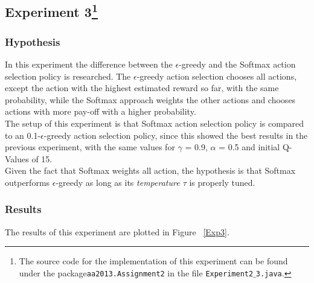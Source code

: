 \documentclass[11pt]{article}
\begin{document}
\subsection[title]{Experiment 3\footnote{The source code for the implementation of this experiment can be found under the package\texttt{aa2013.Assignment2} in the file \texttt{Experiment2$\_$3.java}.}}
\subsubsection{Hypothesis}
In this experiment the difference between the $\epsilon$-greedy and the Softmax action selection policy is researched. The $\epsilon$-greedy action selection chooses all actions, except the action with the highest estimated reward so far, with the same probability, while the Softmax approach weights the other actions and chooses actions with more pay-off with a higher probability.\\
The setup of this experiment is that Softmax action selection policy is compared to an 0.1-$\epsilon$-greedy action selection policy, since this showed the best results in the previous experiment, with the same values for $\gamma$ = 0.9, $\alpha$ = 0.5 and initial Q-Values of 15. \\
Given the fact that Softmax weights all action, the hypothesis is that Softmax outperforms $\epsilon$-greedy as long as its \emph{temperature $\tau$} is properly tuned.





\subsubsection{Results}
The results of this experiment are plotted in Figure ~\ref{Exp3}.
\end{document}
